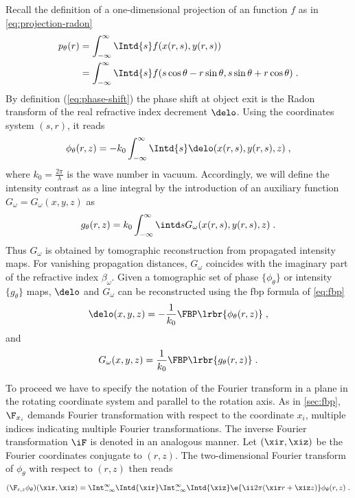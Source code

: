 \documentclass[
twoside,
openright,
titlepage,
numbers=noenddot,
headinclude,
fleqn,
a4paper,
footinclude=true,
cleardoublepage=empty,
abstractoff,
BCOR=5mm,
paper=a4,
fontsize=11pt,
british,ngerman,american,
]{scrreprt}
\begin{document}
Recall the definition of a one-dimensional projection of an function
$f$ as in \cref{eq:projection-radon}
\begin{equation}
  \label{eq:projection-line-integral-2}
  \begin{split}
    p_\theta(r) & = \int_{-\infty}^\infty\Intd{s}f(x(r,s),y(r,s))
    \\ & = \int_{-\infty}^\infty\Intd{s}
    f(s\cos\theta-r\sin\theta,s\sin\theta+r\cos\theta) \;.
  \end{split}
\end{equation}
By definition (\cref{eq:phase-shift}) the phase shift at object exit
is the Radon transform of the real refractive index decrement $\delo$.
Using the coordinates system $(s,r)$, it reads 
\begin{equation}
  \label{eq:phase}
  \phi_\theta(r,z) = 
  -k_0\int_{-\infty}^\infty\Intd{s}\delo(x(r,s),y(r,s),z)\;,
\end{equation}
where $k_0=\frac{2\pi}{\lambda}$ is the wave number in vacuum.
Accordingly, we will define the intensity contrast as a line integral
by the introduction of an auxiliary function
$G_\omega=G_\omega(x,y,z)$ as
\begin{equation}
  \label{eq:g-proj}
  g_\theta(r,z) = k_0\int_{-\infty}^\infty\intd s 
  G_\omega(x(r,s),y(r,s),z) \;.
\end{equation}
Thus $G_\omega$ is obtained by tomographic reconstruction from
propagated intensity maps.  For vanishing propagation distances,
$G_\omega$ coincides with the imaginary part of the refractive index
$\beta_\omega$.  Given a tomographic set of phase $\{\phi_\theta\}$ or
intensity $\{g_\theta\}$ maps, $\delo$ and $G_\omega$ can be
reconstructed using the \ac{fbp} formula of \cref{eq:fbp}
\begin{equation}
  \label{eq:delta-fbp}
  \delo(x,y,z) = -\frac{1}{k_0}\FBP\lrbr{ \phi_\theta(r,z) } \;,
\end{equation}
and
\begin{equation}
  \label{eq:g-fbp}
  G_\omega(x,y,z)=\frac{1}{k_0}\FBP\lrbr{ g_\theta(r,z) } \;.
\end{equation}

To proceed we have to specify the notation of the Fourier transform in
a plane in the rotating coordinate system and parallel to the rotation
axis.  As in \cref{sec:fbp}, $\F_{x_i}$ demands Fourier transformation
with respect to the coordinate $x_i$, multiple indices indicating
multiple Fourier transformations.  The inverse Fourier transformation
$\iF$ is denoted in an analogous manner.  Let $(\xir,\xiz)$ be the
Fourier coordinates conjugate to $(r,z)$.  The two-dimensional Fourier
transform of $\phi_\theta$ with respect to $(r,z)$ then reads
\begin{equation}
  \label{eq:ft-rot}
  (\F_{r,z}\phi_\theta)(\xir,\xiz) \equiv 
  \Int_{-\infty}^\infty\Intd{\xir}
  \Int_{-\infty}^\infty\Intd{\xiz}
  \e{\ii 2\pi(\xir r + \xiz z)} \phi_\theta(r,z) \;.
\end{equation}
\end{document}
